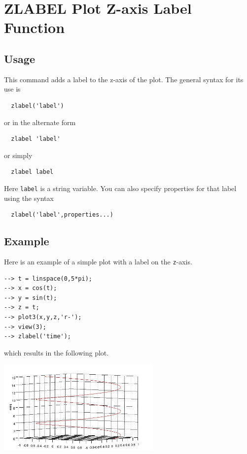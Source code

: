 \section{ZLABEL Plot Z-axis Label Function}

\subsection{Usage}

This command adds a label to the z-axis of the plot.  The general syntax
for its use is
\begin{verbatim}
  zlabel('label')
\end{verbatim}
or in the alternate form
\begin{verbatim}
  zlabel 'label'
\end{verbatim}
or simply
\begin{verbatim}
  zlabel label
\end{verbatim}
Here \verb|label| is a string variable.  You can also specify properties
for that label using the syntax
\begin{verbatim}
  zlabel('label',properties...) 
\end{verbatim}
\subsection{Example}

Here is an example of a simple plot with a label on the \verb|z|-axis.
\begin{verbatim}
--> t = linspace(0,5*pi);
--> x = cos(t);
--> y = sin(t);
--> z = t;
--> plot3(x,y,z,'r-');
--> view(3);
--> zlabel('time');
\end{verbatim}
which results in the following plot.


\centerline{\includegraphics[width=8cm]{zlabel1}}

